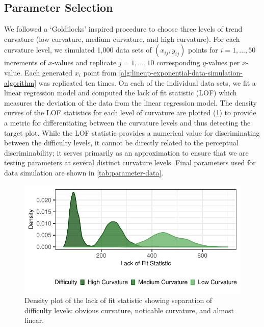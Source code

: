 \documentclass[12pt]{article}
\begin{document}
\hypertarget{lineups-parameter-selection}{%
\subsection{Parameter Selection}\label{lineups-parameter-selection}}

We followed a `Goldilocks' inspired procedure to choose three levels of
trend curvature (low curvature, medium curvature, and high curvature).
For each curvature level, we simulated 1,000 data sets of
\((x_{ij}, y_{ij})\) points for \(i = 1,...,50\) increments of
\(x\)-values and replicate \(j = 1,...,10\) corresponding \(y\)-values
per \(x\)-value. Each generated \(x_i\) point from
\cref{alg:lineup-exponential-data-simulation-algorithm} was replicated
ten times. On each of the individual data sets, we fit a linear
regression model and computed the lack of fit statistic (LOF) which
measures the deviation of the data from the linear regression model. The
density curves of the LOF statistics for each level of curvature are
plotted (\cref{fig:lof-density-curves}) to provide a metric for
differentiating between the curvature levels and thus detecting the
target plot. While the LOF statistic provides a numerical value for
discriminating between the difficulty levels, it cannot be directly
related to the perceptual discriminability; it serves primarily as an
approximation to ensure that we are testing parameters at several
distinct curvature levels. Final parameters used for data simulation are
shown in \cref{tab:parameter-data}.

\begin{figure}[tbp]

{\centering \includegraphics[width=1\linewidth,]{logarithmic-lineups_files/figure-latex/lof-density-curves-1} 

}

\caption[Lineup parameter selection]{Density plot of the lack of fit statistic showing separation of difficulty levels: obvious curvature, noticable curvature, and almost linear.}\label{fig:lof-density-curves}
\end{figure}
\end{document}
